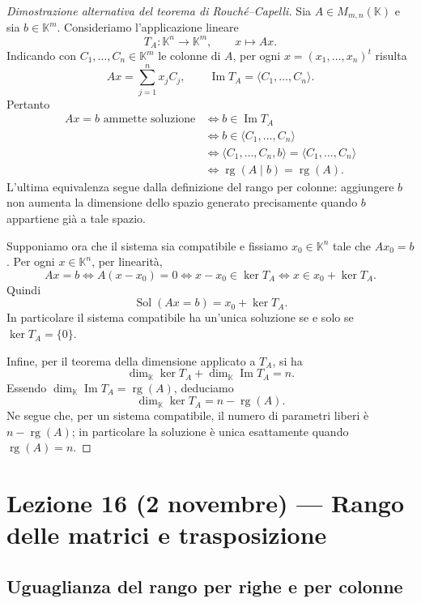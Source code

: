 \documentclass[11pt,a4paper]{article}
\newcommand{\KK}{\mathbb{K}}
\theoremstyle{plain}
\theoremstyle{definition}
\theoremstyle{remark}
\begin{document}
\begin{proof}[Dimostrazione alternativa del teorema di Rouch\'e--Capelli]
Sia $A\in M_{m,n}(\KK)$ e sia $b\in\KK^m$. Consideriamo l'applicazione lineare
\[
 T_A:\KK^n\longrightarrow\KK^m,\qquad x\longmapsto Ax.
\]
Indicando con $C_1,\ldots,C_n\in\KK^m$ le colonne di $A$, per ogni $x=(x_1,\ldots,x_n)^t$ risulta
\[
 Ax=\sum_{j=1}^n x_jC_j,
 \qquad \operatorname{Im}T_A=\langle C_1,\ldots,C_n\rangle.
\]
Pertanto
\[
\begin{aligned}
 Ax=b\text{ ammette soluzione}
 &\iff b\in\operatorname{Im}T_A\\
 &\iff b\in\langle C_1,\ldots,C_n\rangle\\
 &\iff \langle C_1,\ldots,C_n,b\rangle
          =\langle C_1,\ldots,C_n\rangle\\
 &\iff \operatorname{rg}(A\mid b)=\operatorname{rg}(A).
\end{aligned}
\]
L'ultima equivalenza segue dalla definizione del rango per colonne: aggiungere $b$ non aumenta la dimensione dello spazio generato precisamente quando $b$ appartiene gi\`a a tale spazio.

Supponiamo ora che il sistema sia compatibile e fissiamo $x_0\in\KK^n$ tale che $Ax_0=b$. Per ogni $x\in\KK^n$, per linearit\`a,
\[
 Ax=b
 \iff A(x-x_0)=0
 \iff x-x_0\in\ker T_A
 \iff x\in x_0+\ker T_A.
\]
Quindi
\[
 \operatorname{Sol}(Ax=b)=x_0+\ker T_A.
\]
In particolare il sistema compatibile ha un'unica soluzione se e solo se $\ker T_A=\{0\}$.

Infine, per il teorema della dimensione applicato a $T_A$, si ha
\[
 \dim_{\KK}\ker T_A+\dim_{\KK}\operatorname{Im}T_A=n.
\]
Essendo $\dim_{\KK}\operatorname{Im}T_A=\operatorname{rg}(A)$, deduciamo
\[
 \dim_{\KK}\ker T_A=n-\operatorname{rg}(A).
\]
Ne segue che, per un sistema compatibile, il numero di parametri liberi \`e $n-\operatorname{rg}(A)$; in particolare la soluzione \`e unica esattamente quando $\operatorname{rg}(A)=n$.
\end{proof}

\section{Lezione 16 (2 novembre) --- Rango delle matrici e trasposizione}

\subsection{Uguaglianza del rango per righe e per colonne}
\end{document}
